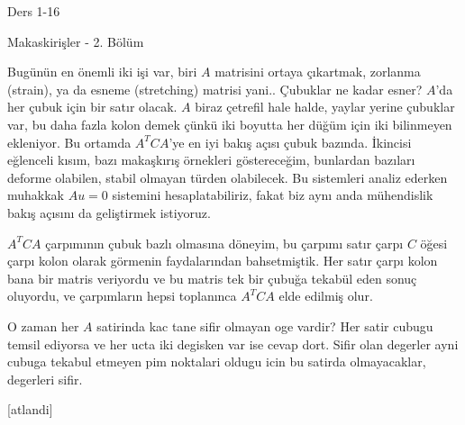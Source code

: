 \documentclass[12pt,fleqn]{article}\usepackage{../../common}
\begin{document}
Ders 1-16

Makaskirişler - 2. Bölüm

Bugünün en önemli iki işi var, biri $A$ matrisini ortaya çıkartmak, zorlanma
(strain), ya da esneme (stretching) matrisi yani.. Çubuklar ne kadar esner?
$A$'da her çubuk için bir satır olacak. $A$ biraz çetrefil hale halde, yaylar
yerine çubuklar var, bu daha fazla kolon demek çünkü iki boyutta her düğüm için
iki bilinmeyen ekleniyor. Bu ortamda $A^T C A$'ye en iyi bakış açısı çubuk
bazında. İkincisi eğlenceli kısım, bazı makaşkırış örnekleri göstereceğim,
bunlardan bazıları deforme olabilen, stabil olmayan türden olabilecek.
Bu sistemleri analiz ederken muhakkak $Au = 0$ sistemini hesaplatabiliriz,
fakat biz aynı anda  mühendislik bakış açısını da geliştirmek istiyoruz.

$A^T C A$ çarpımının çubuk bazlı olmasına döneyim, bu çarpımı satır çarpı $C$
öğesi çarpı kolon olarak görmenin faydalarından bahsetmiştik. Her satır çarpı
kolon bana bir matris veriyordu ve bu matris tek bir çubuğa tekabül eden sonuç
oluyordu, ve çarpımların hepsi toplanınca $A^T C A$ elde edilmiş olur.

O zaman her $A$ satirinda kac tane sifir olmayan oge vardir? Her satir cubugu
temsil ediyorsa ve her ucta iki degisken var ise cevap dort. Sifir olan degerler
ayni cubuga tekabul etmeyen pim noktalari oldugu icin bu satirda olmayacaklar,
degerleri sifir.

[atlandi]
\end{document}
